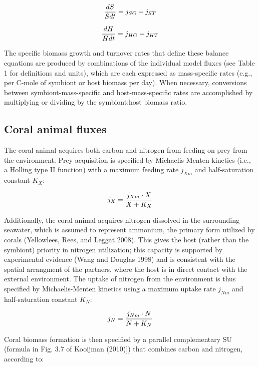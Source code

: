 \documentclass[]{elsarticle} %
\begin{document}
\begin{equation} {dS \over Sdt} = j_{SG} - j_{ST} \end{equation}

\begin{equation} {dH \over Hdt} = j_{HG} - j_{HT} \end{equation}

The specific biomass growth and turnover rates that define these balance
equations are produced by combinations of the individual model fluxes
(see Table 1 for definitions and units), which are each expressed as
mass-specific rates (e.g., per C-mole of symbiont or host biomass per
day). When necessary, conversions between symbiont-mass-specific and
host-mass-specific rates are accomplished by multiplying or dividing by
the symbiont:host biomass ratio.

\subsection{Coral animal fluxes}\label{coral-animal-fluxes}

The coral animal acquires both carbon and nitrogen from feeding on prey
from the environment. Prey acquisition is specified by Michaelis-Menten
kinetics (i.e., a Holling type II function) with a maximum feeding rate
\(j_{Xm}\) and half-saturation constant \(K_X\):

\begin{equation} j_X = {{j_{Xm} \cdot X} \over {X + K_X}} \end{equation}

Additionally, the coral animal acquires nitrogen dissolved in the
surrounding seawater, which is assumed to represent ammonium, the
primary form utilized by corals (Yellowlees, Rees, and Leggat 2008).
This gives the host (rather than the symbiont) priority in nitrogen
utilization; this capacity is supported by experimental evidence (Wang
and Douglas 1998) and is consistent with the spatial arrangment of the
partners, where the host is in direct contact with the external
environment. The uptake of nitrogen from the environment is thus
specified by Michaelis-Menten kinetics using a maximum uptake rate
\(j_{Nm}\) and half-saturation constant \(K_N\):

\begin{equation} j_N = {{j_{Nm} \cdot N} \over {N + K_N}} \end{equation}

Coral biomass formation is then specified by a parallel complementary SU
(formula in Fig. 3.7 of Kooijman (2010){]}) that combines carbon and
nitrogen, according to:
\end{document}
